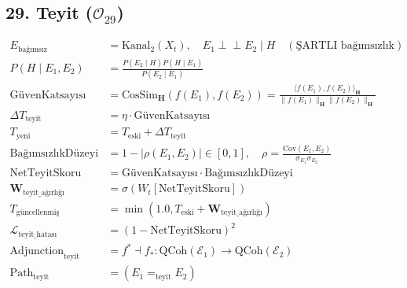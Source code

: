 \documentclass[11pt, a4paper]{article}
\begin{document}
\subsection{29. Teyit ($\mathcal{O}_{29}$)}
\begin{align}
E_{\text{bağımsız}} &= \text{Kanal}_2(X_t), \quad E_1 \perp\!\!\!\perp E_2 \mid H \quad (\text{ŞARTLI bağımsızlık}) \\
P(H \mid E_1, E_2) &= \frac{P(E_2 \mid H) P(H \mid E_1)}{P(E_2 \mid E_1)} \\
\text{GüvenKatsayısı} &= \text{CosSim}_{\mathbf{H}}(f(E_1), f(E_2)) = \frac{\langle f(E_1), f(E_2) \rangle_{\mathbf{H}}}{\|f(E_1)\|_{\mathbf{H}} \|f(E_2)\|_{\mathbf{H}}} \\
\Delta T_{\text{teyit}} &= \eta \cdot \text{GüvenKatsayısı} \\
T_{\text{yeni}} &= T_{\text{eski}} + \Delta T_{\text{teyit}} \\
\text{BağımsızlıkDüzeyi} &= 1 - |\rho(E_1, E_2)| \in [0,1], \quad \rho = \frac{\text{Cov}(E_1,E_2)}{\sigma_{E_1}\sigma_{E_2}} \\
\text{NetTeyitSkoru} &= \text{GüvenKatsayısı} \cdot \text{BağımsızlıkDüzeyi} \\
\mathbf{W}_{\text{teyit\_ağırlığı}} &= \sigma(W_t [\text{NetTeyitSkoru}]) \\
T_{\text{güncellenmiş}} &= \min(1.0, T_{\text{eski}} + \mathbf{W}_{\text{teyit\_ağırlığı}}) \\
\mathcal{L}_{\text{teyit\_hatası}} &= (1 - \text{NetTeyitSkoru})^2 \\
\text{Adjunction}_{\text{teyit}} &= f^* \dashv f_* : \text{QCoh}(\mathcal{E}_1) \to \text{QCoh}(\mathcal{E}_2) \\
\text{Path}_{\text{teyit}} &= (E_1 =_{\text{teyit}} E_2)
\end{align}
\end{document}
